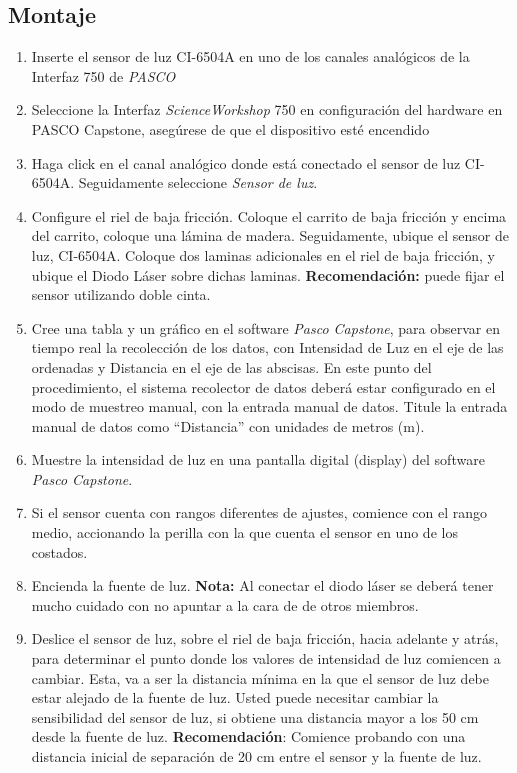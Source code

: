 \documentclass[12pt,letterpaper]{report}
\begin{document}
\subsection{Montaje}
\begin{enumerate}
    
    \item Inserte el sensor de luz CI-6504A en uno de los canales analógicos de la Interfaz 750 de \textit{PASCO}
    \item Seleccione la Interfaz \textit{ScienceWorkshop} 750 en configuración del hardware en PASCO Capstone, asegúrese de que el dispositivo esté encendido
    \item Haga click en el canal analógico donde está conectado el sensor de luz CI-6504A. Seguidamente seleccione \textit{Sensor de luz}.
    \item Configure el riel de baja fricción. Coloque el carrito de baja fricción y encima del carrito, coloque una lámina de madera. Seguidamente, ubique el sensor de luz, CI-6504A. Coloque dos laminas adicionales en el riel de baja fricción, y ubique el Diodo Láser sobre dichas laminas. \textbf{Recomendación:} puede fijar el sensor utilizando doble cinta. 
    \item Cree una tabla y un gráfico en el software \textit{Pasco Capstone}, para observar en tiempo real la recolección de los datos, con Intensidad de Luz en el eje de las ordenadas y Distancia en el eje de las abscisas. En este punto del procedimiento, el sistema recolector de datos deberá estar configurado en el modo de muestreo manual, con la entrada manual de datos. Titule la entrada manual de datos como “Distancia” con unidades de metros (m).
    \item Muestre la intensidad de luz en una pantalla digital (display) del software \textit{Pasco Capstone}.
    \item Si el sensor cuenta con rangos diferentes de ajustes, comience con el rango medio, accionando la perilla con la que cuenta el sensor en uno de los costados.
    \item Encienda la fuente de luz. \textbf{Nota:} Al conectar el diodo láser se deberá tener mucho cuidado con no apuntar a la cara de de otros miembros.
    \item Deslice el sensor de luz, sobre el riel de baja fricción, hacia adelante y atrás, para determinar el punto donde los valores de intensidad de luz comiencen a cambiar. Esta, va a ser la distancia mínima en la que el sensor de luz debe estar alejado de la fuente de luz. Usted puede necesitar cambiar la sensibilidad del sensor de luz, si obtiene una distancia mayor a los 50 cm desde la fuente de luz. \textbf{Recomendación}: Comience probando con una distancia inicial de separación de 20 cm entre el sensor y la fuente de luz.
\end{enumerate}
\end{document}
